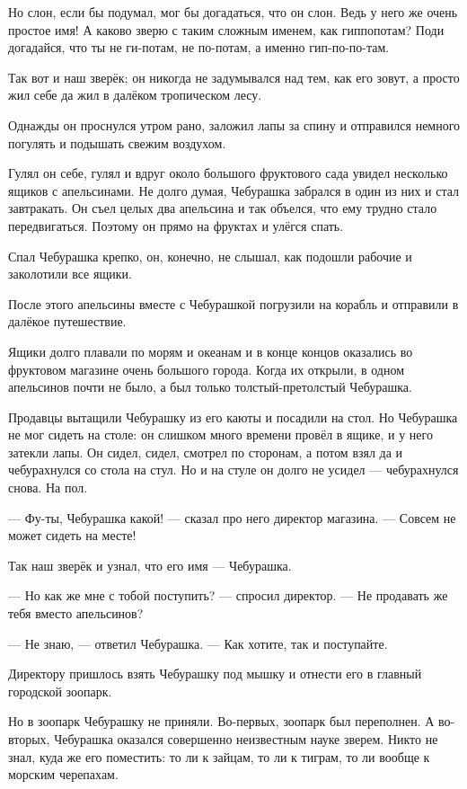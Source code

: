 Но слон, если бы подумал, мог бы догадаться, что он слон. Ведь у него же очень простое имя! А каково зверю с таким сложным именем, как гиппопотам? Поди догадайся, что ты не ги-потам, не по-потам, а именно гип-по-по-там.

Так вот и наш зверёк; он никогда не задумывался над тем, как его зовут, а просто жил себе да жил в далёком тропическом лесу.

Однажды он проснулся утром рано, заложил лапы за спину и отправился немного погулять и подышать свежим воздухом.

Гулял он себе, гулял и вдруг около большого фруктового сада увидел несколько ящиков с апельсинами. Не долго думая, Чебурашка забрался в один из них и стал завтракать. Он съел целых два апельсина и так объелся, что ему трудно стало передвигаться. Поэтому он прямо на фруктах и улёгся спать.

Спал Чебурашка крепко, он, конечно, не слышал, как подошли рабочие и заколотили все ящики.

После этого апельсины вместе с Чебурашкой погрузили на корабль и отправили в далёкое путешествие.

Ящики долго плавали по морям и океанам и в конце концов оказались во фруктовом магазине очень большого города. Когда их открыли, в одном апельсинов почти не было, а был только толстый-претолстый Чебурашка.

Продавцы вытащили Чебурашку из его каюты и посадили на стол. Но Чебурашка не мог сидеть на столе: он слишком много времени провёл в ящике, и у него затекли лапы. Он сидел, сидел, смотрел по сторонам, а потом взял да и чебурахнулся со стола на стул. Но и на стуле он долго не усидел — чебурахнулся снова. На пол.

— Фу-ты, Чебурашка какой! — сказал про него директор магазина. — Совсем не может сидеть на месте!

Так наш зверёк и узнал, что его имя — Чебурашка.

— Но как же мне с тобой поступить? — спросил директор. — Не продавать же тебя вместо апельсинов?

— Не знаю, — ответил Чебурашка. — Как хотите, так и поступайте.

Директору пришлось взять Чебурашку под мышку и отнести его в главный городской зоопарк.

Но в зоопарк Чебурашку не приняли. Во-первых, зоопарк был переполнен. А во-вторых, Чебурашка оказался совершенно неизвестным науке зверем. Никто не знал, куда же его поместить: то ли к зайцам, то ли к тиграм, то ли вообще к морским черепахам.

